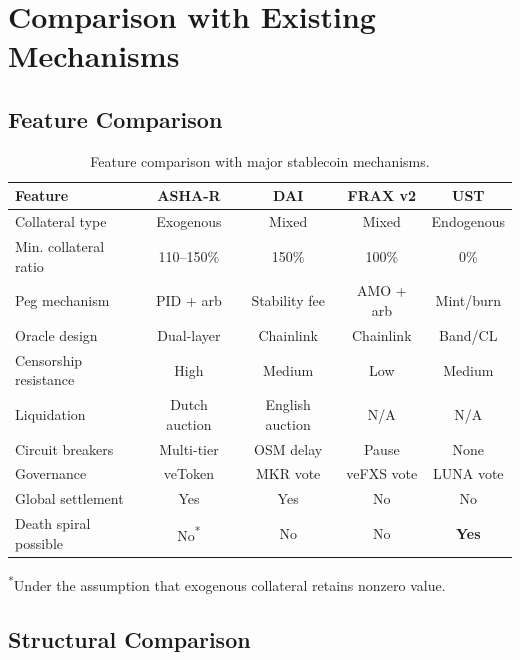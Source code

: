 \documentclass[11pt,a4paper]{article}
\begin{document}
\section{Comparison with Existing Mechanisms}
\label{sec:comparison}

\subsection{Feature Comparison}

\begin{table}[H]
\centering
\caption{Feature comparison with major stablecoin mechanisms.}
\label{tab:comparison}
\begin{tabular}{@{}p{3.5cm}cccc@{}}
\toprule
\textbf{Feature} & \textbf{ASHA-R} & \textbf{DAI} & \textbf{FRAX v2} & \textbf{UST} \\
\midrule
Collateral type          & Exogenous & Mixed & Mixed & Endogenous \\
Min. collateral ratio    & 110--150\% & 150\% & 100\% & 0\% \\
Peg mechanism            & PID + arb & Stability fee & AMO + arb & Mint/burn \\
Oracle design            & Dual-layer & Chainlink & Chainlink & Band/CL \\
Censorship resistance    & High & Medium & Low & Medium \\
Liquidation              & Dutch auction & English auction & N/A & N/A \\
Circuit breakers         & Multi-tier & OSM delay & Pause & None \\
Governance               & veToken & MKR vote & veFXS vote & LUNA vote \\
Global settlement        & Yes & Yes & No & No \\
Death spiral possible    & No\textsuperscript{*} & No & No & \textbf{Yes} \\
\bottomrule
\end{tabular}
\begin{minipage}{0.9\textwidth}
\small\textsuperscript{*}Under the assumption that exogenous collateral retains nonzero value.
\end{minipage}
\end{table}

\subsection{Structural Comparison}
\end{document}
